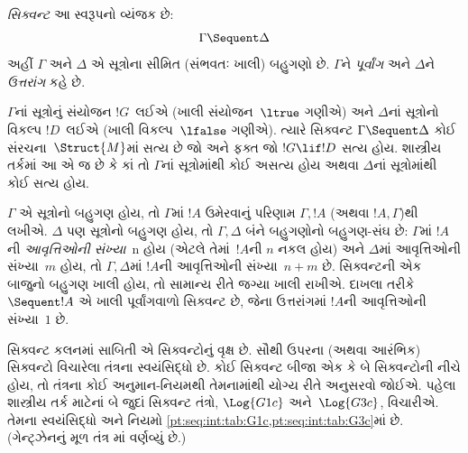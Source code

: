 \begin{defn}[સિક્વન્ટ]
\emph{સિક્વન્ટ} આ સ્વરૂપનો વ્યંજક છે:
\[
\Gamma \Sequent \Delta
\]
અહીં $\Gamma$ અને $\Delta$ એ સૂત્રોના સીમિત
(સંભવતઃ ખાલી) બહુગણો છે.
$\Gamma$ને \emph{પૂર્વાંગ} અને $\Delta$ને \emph{ઉત્તરાંગ} કહે છે.
\end{defn}

$\Gamma$નાં સૂત્રોનું સંયોજન $!G$~લઈએ
(ખાલી સંયોજન~$\ltrue$ ગણીએ)
અને $\Delta$નાં સૂત્રોનો વિકલ્પ $!D$~લઈએ
(ખાલી વિકલ્પ~$\lfalse$ ગણીએ).
ત્યારે સિક્વન્ટ $\Gamma \Sequent \Delta$
કોઈ સંરચના~$\Struct{M}$માં સત્ય છે
જો અને ફક્ત જો $!G \lif !D$ સત્ય હોય.
શાસ્ત્રીય તર્કમાં આ એ જ છે કે
કાં તો $\Gamma$નાં સૂત્રોમાંથી કોઈ અસત્ય હોય
અથવા $\Delta$નાં સૂત્રોમાંથી કોઈ સત્ય હોય.

$\Gamma$ એ સૂત્રોનો બહુગણ હોય,
તો $\Gamma$માં $!A$ ઉમેરવાનું પરિણામ
$\Gamma, !A$ (અથવા $!A, \Gamma$)થી લખીએ.
$\Delta$ પણ સૂત્રોનો બહુગણ હોય,
તો $\Gamma, \Delta$ બંને બહુગણોનો બહુગણ-સંઘ છે:
$\Gamma$માં $!A$ની \emph{આવૃત્તિઓની સંખ્યા}~n હોય
(એટલે તેમાં~$!A$ની $n$ નકલ હોય)
અને $\Delta$માં આવૃત્તિઓની સંખ્યા~$m$ હોય,
તો $\Gamma, \Delta$માં $!A$ની આવૃત્તિઓની સંખ્યા~$n+m$ છે.
સિક્વન્ટની એક બાજુનો બહુગણ ખાલી હોય,
તો સામાન્ય રીતે જગ્યા ખાલી રાખીએ.
દાખલા તરીકે $\Sequent !A$ એ ખાલી પૂર્વાંગવાળો સિક્વન્ટ છે,
જેના ઉત્તરાંગમાં $!A$ની આવૃત્તિઓની સંખ્યા~$1$ છે.

સિક્વન્ટ કલનમાં સાબિતી એ સિક્વન્ટોનું વૃક્ષ છે.
સૌથી ઉપરના (અથવા આરંભિક) સિક્વન્ટો
વિચારેલા તંત્રના સ્વયંસિદ્ધો છે.
કોઈ સિક્વન્ટ બીજા એક કે બે સિક્વન્ટોની નીચે હોય,
તો તંત્રના કોઈ અનુમાન-નિયમથી તેમનામાંથી યોગ્ય રીતે અનુસરવો જોઈએ.
પહેલા શાસ્ત્રીય તર્ક માટેનાં બે જુદાં સિક્વન્ટ તંત્રો,
$\Log{G1c}$ અને~$\Log{G3c}$, વિચારીએ.
તેમના સ્વયંસિદ્ધો અને નિયમો
\cref{pt:seq:int:tab:G1c,pt:seq:int:tab:G3c}માં છે.
 (ગેન્ટ્ઝેનનું મૂળ તંત્ર 
માં વર્ણવ્યું છે.)

\begingroup
\makeatletter{}\makeatother

\label{guunit:OLP-0704}


